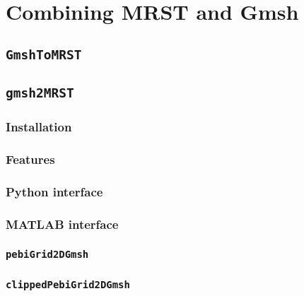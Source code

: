 \section{Combining MRST and Gmsh}
\label{sec:combining}

\subsection{\texttt{GmshToMRST}}

\subsection{\texttt{gmsh2MRST}}

\subsubsection{Installation}

\subsubsection{Features}

\subsubsection{Python interface}

\subsubsection{MATLAB interface}

\subsubsection{\texttt{pebiGrid2DGmsh}}

\subsubsection{\texttt{clippedPebiGrid2DGmsh}}

